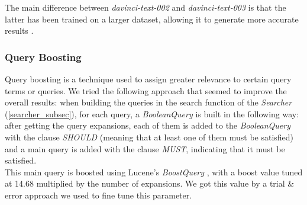 The main difference between \textit{davinci-text-002} and \textit{davinci-text-003} is that the latter has been trained on a larger dataset, allowing it to generate more accurate results \cite{davincicomparison}.


\enlargethispage{2\baselineskip}
\subsubsection{Query Boosting}
Query boosting is a technique used to assign greater relevance to certain query terms or queries.\newline
We tried the following approach that seemed to improve the overall results: when building the queries in the search function of the \textit{Searcher} (\ref{searcher_subsec}), for each query, a \textit{BooleanQuery} \cite{lucenebooleanquery} is built in the following way: 
after getting the query expansions, each of them is added to the \textit{BooleanQuery} with the clause \textit{SHOULD} (meaning that at least one of them must be satisfied) and a main query is added with the clause \textit{MUST}, indicating that it must be satisfied. \\
This main query is boosted using Lucene's \textit{BoostQuery} \cite{luceneboostquery}, with a boost value tuned at 14.68 multiplied by the number of expansions. We got this value by a trial \& error approach we used to fine tune this parameter.

